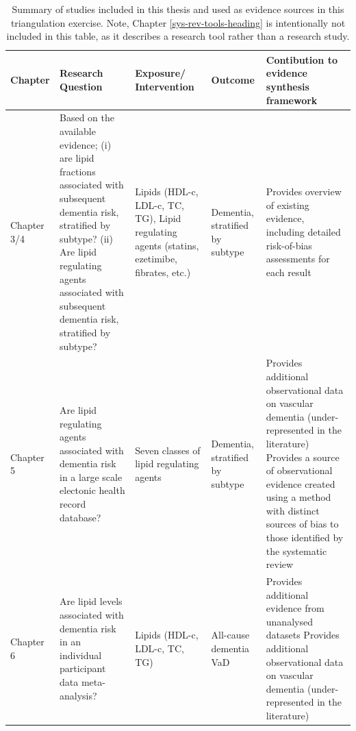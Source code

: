 \documentclass[a4paper, twoside]{templates/ociamthesis}
\begin{document}
\begin{table}[H]

\caption[Summary of research designs included in this thesis]{\label{tab:thesisOverview-table}Summary of studies included in this thesis and used as evidence sources in this triangulation exercise. Note, Chapter \ref{sys-rev-tools-heading} is intentionally not included in this table, as it describes a research tool rather than a research study.}
\centering
\begin{tabular}[t]{>{\raggedright\arraybackslash}p{6em}>{\raggedright\arraybackslash}p{16em}>{\raggedright\arraybackslash}p{7em}>{\raggedright\arraybackslash}p{7em}>{\raggedright\arraybackslash}p{16em}}
\toprule
\textbf{Chapter} & \textbf{Research Question} & \textbf{Exposure/ Intervention} & \textbf{Outcome} & \textbf{Contibution to evidence synthesis framework}\\
\midrule
Chapter 3/4 & Based on the available evidence; \newline (i) are lipid fractions associated with subsequent dementia risk, stratified by subtype? \newline (ii) Are lipid regulating agents associated with subsequent dementia risk, stratified by subtype? \newline & Lipids (HDL-c, LDL-c, TC, TG), \newline \newline Lipid regulating agents (statins, ezetimibe, fibrates, etc.) & Dementia, stratified by subtype & Provides overview of existing evidence, including detailed risk-of-bias assessments for each result\\
\midrule
Chapter 5 & Are lipid regulating agents associated with dementia risk in a large scale electonic health record database? \newline & Seven classes of lipid regulating agents & Dementia, stratified by subtype & Provides additional observational data on vascular dementia (under-represented in the literature) \newline \newline Provides a source of observational evidence created using a method with distinct sources of bias to those identified by the systematic review\\
\midrule
Chapter 6 & Are lipid levels associated with dementia risk in an individual participant data meta-analysis? \newline & Lipids (HDL-c, LDL-c, TC, TG) & All-cause dementia \newline VaD & Provides additional evidence from unanalysed datasets \newline \newline Provides additional observational data on vascular dementia (under-represented in the literature)\\
\bottomrule
\end{tabular}
\end{table}
\end{document}

